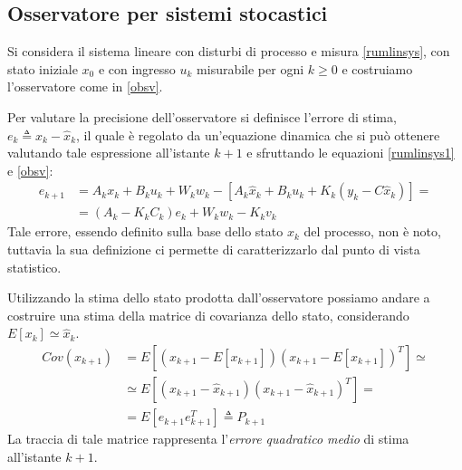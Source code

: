 \subsection{Osservatore per sistemi stocastici}
Si considera il sistema lineare con disturbi di processo e misura \eqref{rumlinsys}, con stato iniziale $x_0$ e con ingresso $u_k$ misurabile per ogni $k \geq 0$ e costruiamo l'osservatore come in \eqref{obsv}.

Per valutare la precisione dell'osservatore si definisce l'errore di stima, \\ $e_k \triangleq x_k-\hat{x}_k$, il quale è regolato da un'equazione dinamica che si può ottenere valutando tale espressione all'istante $k+1$ e sfruttando le equazioni \eqref{rumlinsys1} e \eqref{obsv}:
\begin{equation}
\label{errore}
\begin{split}
e_{k+1}&=A_kx_k+B_ku_k+W_kw_k-[A_k\hat{x}_k+B_ku_k+K_k(y_k-C\hat{x}_k)] = \\
&=(A_k-K_kC_k)e_k+W_kw_k-K_kv_k
\end{split}
\end{equation}
Tale errore, essendo definito sulla base dello stato $x_k$ del processo, non è noto, tuttavia la sua definizione ci permette di caratterizzarlo dal punto di vista statistico.

Utilizzando la stima dello stato prodotta dall'osservatore possiamo andare a costruire una stima della matrice di covarianza dello stato, considerando $E[x_k] \simeq \hat{x}_k$.
\begin{equation}
\label{matrcov}
\begin{split}
Cov(x_{k+1})&=E[(x_{k+1}-E[x_{k+1}])(x_{k+1}-E[x_{k+1}])^T] \simeq\\
&\simeq E[(x_{k+1}-\hat{x}_{k+1})(x_{k+1}-\hat{x}_{k+1})^T]=\\
&=E[e_{k+1}e_{k+1}^T] \triangleq P_{k+1}
\end{split}
\end{equation}
La traccia di tale matrice rappresenta l'\textit{errore quadratico medio} di stima all'istante $k+1$.


